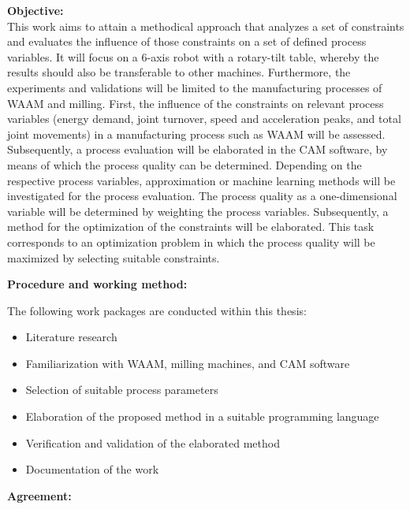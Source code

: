 \vspace{5mm}
\textbf{Objective:}\\
This work aims to attain a methodical approach that analyzes a set of constraints and 
evaluates the influence of those constraints on a set of defined process variables. It will focus
on a 6-axis robot with a rotary-tilt table, whereby the results should also be transferable to other machines. Furthermore, the experiments and validations will be limited to the 
manufacturing processes of \acrshort{WAAM} and milling.
First, the influence of the constraints on relevant process variables (energy demand, joint 
turnover, speed and acceleration peaks, and total joint movements) in a manufacturing 
process such as \acrshort{WAAM} will be assessed. Subsequently, a process evaluation will be
elaborated in the \acrshort{CAM} software, by means of which the process quality can be determined.
Depending on the respective process variables, approximation or machine learning methods 
will be investigated for the process evaluation. The process quality as a one-dimensional 
variable will be determined by weighting the process variables. Subsequently, a method for 
the optimization of the constraints will be elaborated. This task corresponds to an optimization 
problem in which the process quality will be maximized by selecting suitable constraints.\newline


\vspace{5mm}
\textbf{Procedure and working method:}\newline

The following work packages are conducted within this thesis:

\begin{itemize}
\item Literature research
\item Familiarization with \acrshort{WAAM}, milling machines, and \acrshort{CAM} software
\item Selection of suitable process parameters
\item Elaboration of the proposed method in a suitable programming language
\item Verification and validation of the elaborated method
\item Documentation of the work

\newpage	 
\end{itemize}
\vspace{1.0cm}
\textbf{Agreement:}\\

